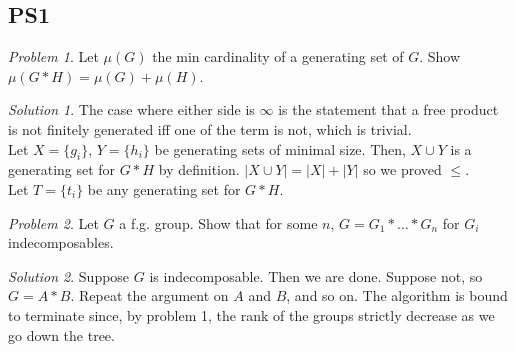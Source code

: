 \documentclass[11pt]{article}
\theoremstyle{definition}
\theoremstyle{example}
\theoremstyle{remark}
\theoremstyle{lemma}
\theoremstyle{proposition}
\theoremstyle{Problem}
\newtheorem{problem}{Problem}[section]
\theoremstyle{Solution}
\newtheorem{solution}{Solution}[section]
\theoremstyle{theorem}
\begin{document}
\subsection{PS1}
\begin{problem}
Let $\mu(G)$ the min cardinality of a generating set of $G$. Show $\mu(G*H) = \mu(G) + \mu(H)$.
\end{problem}
\begin{solution}
The case where either side is $\infty$ is the statement that a free product is not finitely generated iff one of the term is not, which is trivial.\\
Let $X=\{g_i\}$, $Y=\{h_i\}$ be generating sets of minimal size. Then, $X\cup Y$ is a generating set for $G*H$ by definition. $|X\cup Y| = |X| + |Y|$ so we proved $\leq$.\\
Let $T=\{t_i\}$ be any generating set for $G*H$.
\end{solution}

\begin{problem}
Let $G$ a f.g. group. Show that for some $n$, $G=G_1*...*G_n$ for $G_i$ indecomposables.
\end{problem}
\begin{solution}
Suppose $G$ is indecomposable. Then we are done. Suppose not, so $G = A*B$. Repeat the argument on $A$ and $B$, and so on. The algorithm is bound to terminate since, by problem 1, the rank of the groups strictly decrease as we go down the tree.
\end{solution}
\end{document}
